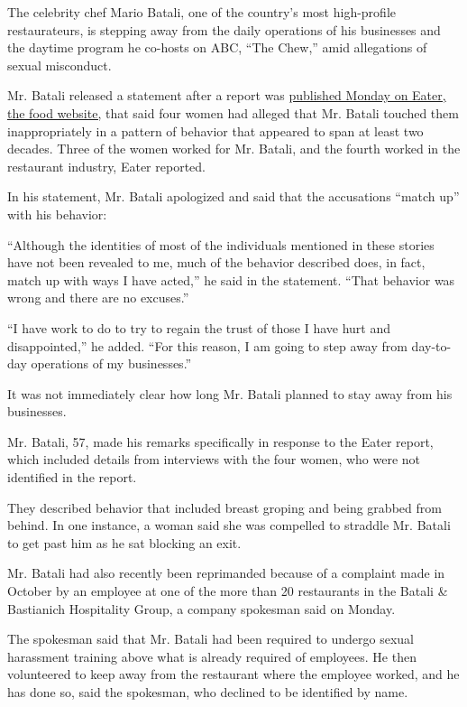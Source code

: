The celebrity chef Mario Batali, one of the country's most high-profile
restaurateurs, is stepping away from the daily operations of his
businesses and the daytime program he co-hosts on ABC, ``The Chew,''
amid allegations of sexual misconduct.

Mr. Batali released a statement after a report was
\href{https://ny.eater.com/2017/12/11/16759540/mario-batali-sexual-misconduct-allegations}{published
Monday on Eater, the food website,} that said four women had alleged
that Mr. Batali touched them inappropriately in a pattern of behavior
that appeared to span at least two decades. Three of the women worked
for Mr. Batali, and the fourth worked in the restaurant industry, Eater
reported.

In his statement, Mr. Batali apologized and said that the accusations
``match up'' with his behavior:

``Although the identities of most of the individuals mentioned in these
stories have not been revealed to me, much of the behavior described
does, in fact, match up with ways I have acted,'' he said in the
statement. ``That behavior was wrong and there are no excuses.''

``I have work to do to try to regain the trust of those I have hurt and
disappointed,'' he added. ``For this reason, I am going to step away
from day-to-day operations of my businesses.''

It was not immediately clear how long Mr. Batali planned to stay away
from his businesses.

Mr. Batali, 57, made his remarks specifically in response to the Eater
report, which included details from interviews with the four women, who
were not identified in the report.

They described behavior that included breast groping and being grabbed
from behind. In one instance, a woman said she was compelled to straddle
Mr. Batali to get past him as he sat blocking an exit.

Mr. Batali had also recently been reprimanded because of a complaint
made in October by an employee at one of the more than 20 restaurants in
the Batali \& Bastianich Hospitality Group, a company spokesman said on
Monday.

The spokesman said that Mr. Batali had been required to undergo sexual
harassment training above what is already required of employees. He then
volunteered to keep away from the restaurant where the employee worked,
and he has done so, said the spokesman, who declined to be identified by
name.

